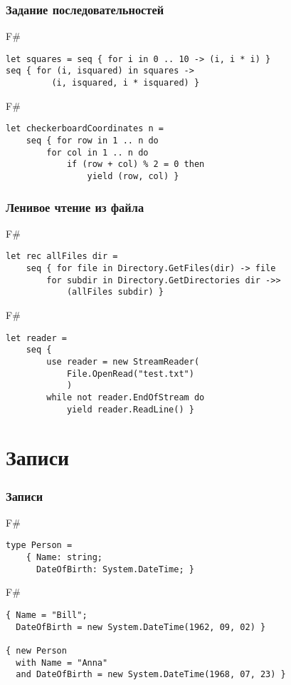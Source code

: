 \documentclass[xetex,mathserif,serif]{beamer}
\begin{document}
	\begin{frame}[fragile]
		\frametitle{Задание последовательностей}
			\begin{exampleblock}{F\#}
				\begin{lstlisting}
let squares = seq { for i in 0 .. 10 -> (i, i * i) }
seq { for (i, isquared) in squares -> 
         (i, isquared, i * isquared) }
\end{lstlisting}
\end{exampleblock}
			
			\begin{exampleblock}{F\#}
				\begin{lstlisting}
let checkerboardCoordinates n =
    seq { for row in 1 .. n do
        for col in 1 .. n do
            if (row + col) % 2 = 0 then
                yield (row, col) }
\end{lstlisting}
\end{exampleblock}	
\end{frame}

	\begin{frame}[fragile]
		\frametitle{Ленивое чтение из файла}
		\begin{exampleblock}{F\#}
			\begin{lstlisting}
let rec allFiles dir =
    seq { for file in Directory.GetFiles(dir) -> file
        for subdir in Directory.GetDirectories dir ->> 
            (allFiles subdir) }
\end{lstlisting}
\end{exampleblock}
		
		\begin{exampleblock}{F\#}
			\begin{lstlisting}
let reader =
    seq { 
        use reader = new StreamReader(
            File.OpenRead("test.txt")
            )
        while not reader.EndOfStream do
            yield reader.ReadLine() }
\end{lstlisting}
\end{exampleblock}	
\end{frame}

	\section{Записи}
	
	\begin{frame}[fragile]
		\frametitle{Записи}
		\begin{exampleblock}{F\#}
			\begin{lstlisting}
type Person =
    { Name: string;
      DateOfBirth: System.DateTime; }
\end{lstlisting}
\end{exampleblock}

		\begin{exampleblock}{F\#}
			\begin{lstlisting}
{ Name = "Bill"; 
  DateOfBirth = new System.DateTime(1962, 09, 02) }

{ new Person
  with Name = "Anna"
  and DateOfBirth = new System.DateTime(1968, 07, 23) }
\end{lstlisting}
\end{exampleblock}
	
\end{frame}
\end{document}
